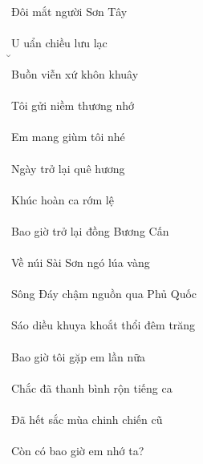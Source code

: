 \documentclass[14pt,a4paper]{extarticle}
\begin{document}
{\Huge \em {} \bao {}   \chan}\\[1ex]
Đôi mắt người Sơn Tây\\[1ex]
{\Huge {}    }\\[1ex]
U uẩn chiều lưu lạc\\[1ex]
{\Huge \u {}   }\\[1ex]
Buồn viễn xứ khôn khuây\\[1ex]
{\Huge {}    }\\[1ex]
Tôi gửi niềm thương nhớ\\[1ex]
{\Huge {}    }\\[1ex]
Em mang giùm tôi nhé\\[1ex]
{\Huge \em \MANg {}  }\\[1ex]
Ngày trở lại quê hương\\[1ex]
{\Huge {}    }\\[1ex]
Khúc hoàn ca rớm lệ\\[1ex]
{\Huge {}  \ca {} }\\[1ex]
Bao giờ trở lại đồng Bương Cấn\\[1ex]
{\Huge \bao {}     }\\[1ex]
Về núi Sài Sơn ngó lúa vàng\\[1ex]
{\Huge {}      }\\[1ex]
Sông Đáy chậm nguồn qua Phủ Quốc\\[1ex]
{\Huge {}    \qua {} }\\[1ex]
Sáo diều khuya khoắt thổi đêm trăng\\[1ex]
{\Huge {}  \khuya {}   }\\[1ex]
Bao giờ tôi gặp em lần nữa\\[1ex]
{\Huge \bao {}   \em {} }\\[1ex]
Chắc đã thanh bình rộn tiếng ca\\[1ex]
{\Huge {}     \ca}\\[1ex]
Đã hết sắc mùa chinh chiến cũ\\[1ex]
{\Huge {}    \chinh {} }\\[1ex]
Còn có bao giờ em nhớ ta?\\[1ex]
{\Huge {}  \bao {} \em {} \ta}
\end{document}
